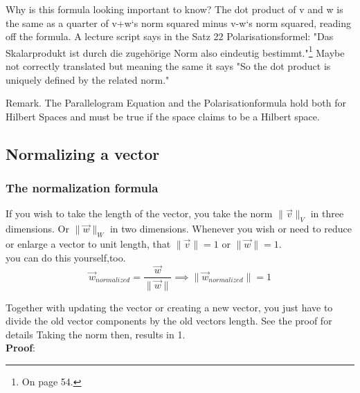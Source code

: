 \documentclass[a4paper]{article}
\begin{document}
\begin{Example}
Why is this formula looking important to know? The dot product of v and w is the same as a quarter of v+w`s norm squared minus v-w`s norm squared, reading off the formula. A lecture script \cite{FerusLA} says in the Satz 22 Polarisationsformel: "Das Skalarprodukt ist durch die zugeh\"orige Norm also eindeutig bestimmt."\footnote{On page 54.} Maybe not correctly translated but meaning the same it says "So the dot product is uniquely defined by the related norm."

Remark. The Parallelogram Equation and the Polarisationformula hold both for Hilbert Spaces and must be true if the space claims to be a Hilbert space.


\subsection{Normalizing a vector}
\label{normalizing_a_vector}
\subsubsection{The normalization formula}

If you wish to take the length of the vector, you take the norm $\|\vec{v}\|_{V}$ in three dimensions. Or $\|\vec{w}\|_{W}$ in two dimensions. Whenever you wish or need to reduce or enlarge a vector to unit length, that $\|\vec{v}\|=1$ or $\|\vec{w}\|=1$.\\
you can do this yourself,too.                     \\

\begin{displaymath}
    \vec{w}_{normalized} = \frac{\vec{w}}{\|\vec{w}\|} \implies \|\vec{w}_{normalized}\| = 1
\end{displaymath}

Together with updating the vector or creating a new vector, you just have to divide the old vector components by the old vectors length. See the proof for details Taking the norm then, results in 1.\\                                                                     
\textbf{Proof}:


\end{Example}
\end{document}
